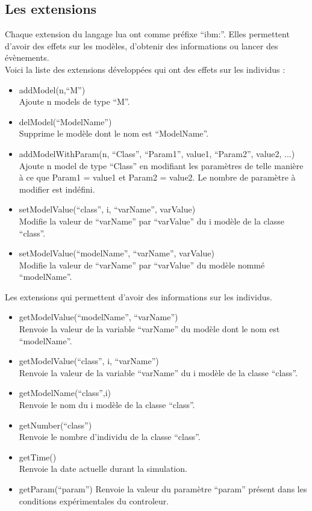 \subsection{Les extensions}
Chaque extension du langage lua ont comme préfixe ``ibm\string:''. Elles permettent d'avoir des effets sur les modèles, d'obtenir des informations ou lancer des évènements.\\
Voici la liste des extensions développées qui ont des effets sur les individus :
\begin{itemize}[label=\textbullet,font=\large]
	\item addModel(n,``M'')\\
	Ajoute n models de type ``M''.
	\item delModel(``ModelName'')\\
	Supprime le modèle dont le nom est ``ModelName''.
	\item addModelWithParam(n, ``Class'', ``Param1'', value1, ``Param2'', value2, ...)\\
	Ajoute n model de type ``Class'' en modifiant les paramètres de telle manière à ce que Param1 = value1 et Param2 = value2. Le nombre de paramètre à modifier est indéfini.
	\item setModelValue(``class'', i, ``varName'', varValue)\\
	Modifie la valeur de ``varName'' par ``varValue'' du i modèle de la classe ``class''.
	\item setModelValue(``modelName'', ``varName'', varValue)\\
	Modifie la valeur de ``varName'' par ``varValue'' du modèle nommé ``modelName''.
\end{itemize}
Les extensions qui permettent d'avoir des informations sur les individus.
\begin{itemize}[label=\textbullet,font=\large]
	\item getModelValue(``modelName'', ``varName'')\\
	Renvoie la valeur de la variable ``varName'' du modèle dont le nom est ``modelName''.
	\item getModelValue(``class'', i, ``varName'')\\
	Renvoie la valeur de la variable ``varName'' du i modèle de la classe ``class''.
	\item getModelName(``class'',i)\\
	Renvoie le nom du i modèle de la classe ``class''.
	\item getNumber(``class'')\\
	Renvoie le nombre d'individu de la classe ``class''.
	\item getTime()\\
	Renvoie la date actuelle durant la simulation.
	\item getParam(``param'')
	Renvoie la valeur du paramètre ``param'' présent dans les conditions expérimentales du controleur.
\end{itemize}

